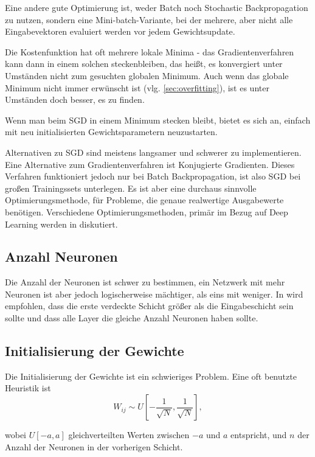 Eine andere gute Optimierung ist, weder Batch noch Stochastic Backpropagation zu nutzen, sondern eine Mini-batch-Variante, bei der mehrere, aber nicht alle Eingabevektoren evaluiert werden vor jedem Gewichtsupdate. 

Die Kostenfunktion hat oft mehrere lokale Minima - das Gradientenverfahren kann dann in einem solchen steckenbleiben, das heißt, es konvergiert unter Umständen nicht zum gesuchten globalen Minimum. Auch wenn das globale Minimum nicht immer erwünscht ist (vlg. \ref{sec:overfitting}), ist es unter Umständen doch besser, es zu finden.

Wenn man beim SGD in einem Minimum stecken bleibt, bietet es sich an, einfach mit neu initialisierten Gewichtsparametern neuzustarten. 

Alternativen zu SGD sind meistens langsamer und schwerer zu implementieren. Eine Alternative zum Gradientenverfahren ist Konjugierte Gradienten. Dieses Verfahren funktioniert jedoch nur bei Batch Backpropagation, ist also SGD bei großen Trainingssets unterlegen. Es ist aber eine durchaus sinnvolle Optimierungsmethode, für Probleme, die genaue realwertige Ausgabewerte benötigen\cite{lecunefficient}.
Verschiedene Optimierungsmethoden, primär im Bezug auf Deep Learning werden in \cite{ngiam2011optimization} diskutiert.

\subsection{Anzahl Neuronen}
Die Anzahl der Neuronen ist schwer zu bestimmen, ein Netzwerk mit mehr Neuronen ist aber jedoch logischerweise mächtiger, als eins mit weniger. In \cite{bengio2012practical} wird empfohlen, dass die erste verdeckte Schicht größer als die Eingabeschicht sein sollte und dass alle Layer die gleiche Anzahl Neuronen haben sollte.

\subsection{Initialisierung der Gewichte}
Die Initialisierung der Gewichte ist ein schwieriges Problem. Eine oft benutzte Heuristik ist 
\begin{equation}
	W_{ij} \sim U [ -\frac{1}{\sqrt{N}} , \frac{1}{\sqrt{N}} ],
\end{equation}

wobei $U[-a, a]$ gleichverteilten Werten zwischen $-a$ und $a$ entspricht, und $n$ der Anzahl der Neuronen in der vorherigen Schicht\cite{glorot2010understanding}. 

